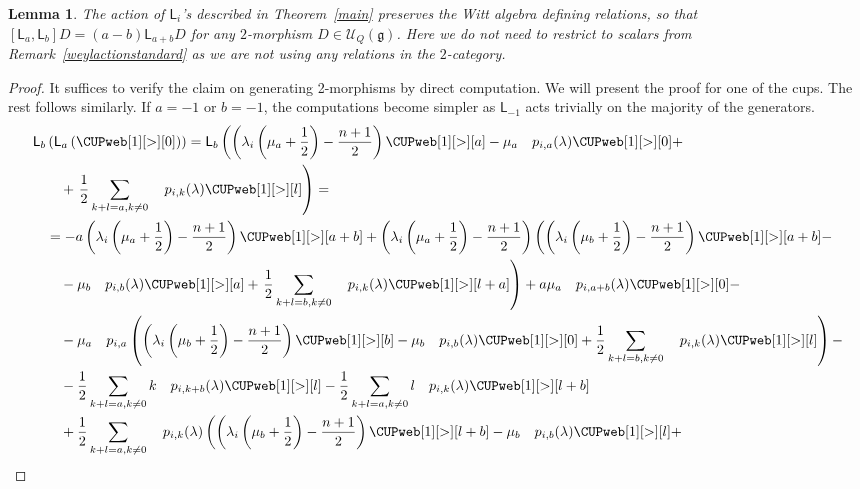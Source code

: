 \documentclass{amsart}
\numberwithin{equation}{section}
\newtheorem{lemma}[thm]{Lemma}
\theoremstyle{definition}
\newcommand{\Ucat}{\mathcal{U}_Q}
\newcommand{\LLn}[1][n]{{\mathsf{L}_{#1}}}
\begin{document}
\begin{lemma} \label{lem:defining}
    The action of $\LLn[i]$'s described in Theorem~\ref{main} preserves the Witt algebra defining relations, so that $[\LLn[a], \LLn[b]] D = (a- b)\LLn[a+b] D$ for any $2$-morphism $D \in \Ucat(\mathfrak{g})$. Here we do not need to restrict to scalars from Remark~\ref{weylactionstandard} as we are not using any relations in the $2$-category. 
\end{lemma}
\begin{proof}
    It suffices to verify the claim on generating 2-morphisms by direct computation. We will present the proof for one of the cups. The rest follows similarly. If $a = -1$ or $b = -1$, the computations become simpler as $\LLn[-1]$ acts trivially on the majority of the generators.
\begin{align*}
         \LLn[b]&\left(\LLn[a]\left(\CUPweb[1][>][0]\right)\right) = \LLn[b] \left( \left(\lambda_i \left(\mu_a + \frac{1}{2}\right) - \frac{n+1}{2}\right) \CUPweb[1][>][a] - \mu_a \quad p_{i,a}(\lambda) \CUPweb[1][>][0] + \right. 
         \\
         & \quad + \left. \frac{1}{2} \sum_{k + l = a, k \neq 0} \quad p_{i,k}(\lambda) \CUPweb[1][>][l] \right) = \\
         &= -a \left(\lambda_i \left(\mu_a + \frac{1}{2}\right) - \frac{n+1}{2}\right) \CUPweb[1][>][a + b] + \left(\lambda_i \left(\mu_a + \frac{1}{2}\right) - \frac{n+1}{2}\right) \left(  \left(\lambda_i \left(\mu_b + \frac{1}{2}\right) - \frac{n+1}{2}\right) \CUPweb[1][>][a+ b] - \right. 
\\
         &\quad - \mu_b \quad p_{i,b}(\lambda) \CUPweb[1][>][a]  + \left. \frac{1}{2} \sum_{k + l = b, k \neq 0} \quad p_{i,k}(\lambda) \CUPweb[1][>][l + a]  \right) + a \mu_a \quad p_{i,a + b}(\lambda) \CUPweb[1][>][0] - \\
         &\quad - \mu_a \quad p_{i,a} \left(\left(\lambda_i \left(\mu_b + \frac{1}{2}\right) - \frac{n+1}{2}\right) \CUPweb[1][>][b] - \mu_b \quad p_{i,b}(\lambda) \CUPweb[1][>][0] + \frac{1}{2} \sum_{k + l = b, k \neq 0} \quad p_{i,k}(\lambda) \CUPweb[1][>][l]  \right) - \\
        &\quad - \frac{1}{2}  \sum_{k + l = a, k \neq 0} k \quad p_{i,k + b}(\lambda) \CUPweb[1][>][l] - \frac{1}{2}  \sum_{k + l = a, k \neq 0} l \quad p_{i,k}(\lambda) \CUPweb[1][>][l + b] \\
        &\quad +  \frac{1}{2}  \sum_{k + l = a, k \neq 0} \quad p_{i,k}(\lambda) \left(  \left(\lambda_i \left(\mu_b + \frac{1}{2}\right) - \frac{n+1}{2}\right) \CUPweb[1][>][l+ b] - \mu_b \quad p_{i,b}(\lambda) \CUPweb[1][>][l] + \right. 

\end{align*}
\end{proof}
\end{document}

